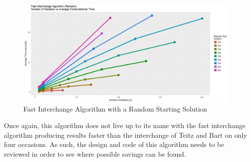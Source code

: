 \documentclass[11pt]{article}
\begin{document}
	\begin{figure}[H]
		\begin{center}
			\includegraphics[width=15cm]{FintRand.png}
			\caption{Fast Interchange Algorithm with a Random Starting Solution}
			\label{FintRand.median.time}
		\end{center}
	\end{figure}

	Once again, this algorithm does not live up to its name with the fast interchange algorithm producing results faster than the interchange of Teitz and Bart on only four occasions.  As such, the design and code of this algorithm needs to be reviewed in order to see where possible savings can be found.
\end{document}
